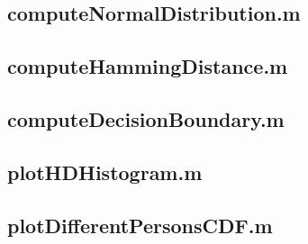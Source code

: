 \documentclass[10pt,a4paper]{article}
\begin{document}
\subsection{computeNormalDistribution.m}\label{a:computeND}

\subsection{computeHammingDistance.m}\label{a:computeHD}

\subsection{computeDecisionBoundary.m}\label{a:computeDB}

\subsection{plotHDHistogram.m}\label{a:plotHDHistogram}

\subsection{plotDifferentPersonsCDF.m}\label{a:plotCDF}
\end{document}
